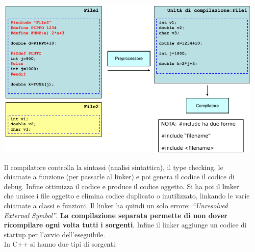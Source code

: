 \documentclass[a4paper,12pt, oneside]{book}
\begin{document}
\begin{center}
  \includegraphics[scale = 0.5]{img/pre.png}
\end{center}
Il compilatore controlla la sintassi (analisi sintattica), il type
checking, le chiamate a funzione (per passarle al linker) e poi genera
il codice il codice di debug. Infine ottimizza il codice e produce il
codice oggetto. Si ha poi il linker che unisce i file oggetto e
elimina codice duplicato o inutilizzato, linkando le varie chiamate a
classi e funzioni. Il linker ha quindi un solo errore:
\textit{``Unresolved External Symbol''}.\textbf{ La compilazione separata
  permette di non dover ricompilare ogni volta tutti i sorgenti}. Infine
il linker aggiunge un codice di startup per l'avvio dell'eseguibile.\\
In C++ si hanno due tipi di sorgenti:
\end{document}

